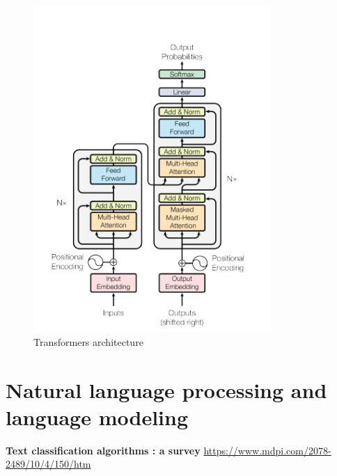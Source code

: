 \begin{figure}[]
         \includegraphics[width=9cm]{thesis/figures/Transformers.PNG}
            \centering
            \caption{Transformers architecture}
            \label{fig:RNN}
\end{figure}
\section{Natural language processing and language modeling}
    \textbf{Text classification algorithms : a survey }\url{https://www.mdpi.com/2078-2489/10/4/150/htm}
